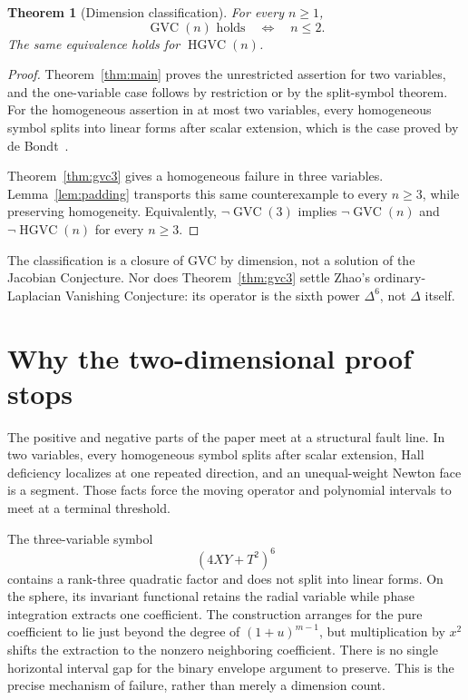 \documentclass[11pt]{article}
\newtheorem{theorem}{Theorem}[section]
\begin{document}
\begin{theorem}[Dimension classification]\label{thm:classification}
For every $n\geq1$,
\begin{equation}\label{eq:classification}
 \operatorname{GVC}(n)\text{ holds}
 \quad\Longleftrightarrow\quad
 n\leq2.
\end{equation}
The same equivalence holds for $\operatorname{HGVC}(n)$.
\end{theorem}

\begin{proof}
Theorem~\ref{thm:main} proves the unrestricted assertion for two variables,
and the one-variable case follows by restriction or by the split-symbol
theorem.  For the homogeneous assertion in at most two variables, every
homogeneous symbol splits into linear forms after scalar extension, which
is the case proved by de Bondt~\cite{deBondt}.

Theorem~\ref{thm:gvc3} gives a homogeneous failure in three variables.
Lemma~\ref{lem:padding} transports this same counterexample to every
$n\geq3$, while preserving homogeneity.  Equivalently,
$\neg\operatorname{GVC}(3)$ implies
$\neg\operatorname{GVC}(n)$ and
$\neg\operatorname{HGVC}(n)$ for every $n\geq3$.
\end{proof}

The classification is a closure of GVC by dimension, not a solution of the
Jacobian Conjecture.  Nor does Theorem~\ref{thm:gvc3} settle Zhao's
ordinary-Laplacian Vanishing Conjecture: its operator is the sixth power
$\Delta^6$, not $\Delta$ itself.

\section{Why the two-dimensional proof stops}

The positive and negative parts of the paper meet at a structural fault
line.  In two variables, every homogeneous symbol splits after scalar
extension, Hall deficiency localizes at one repeated direction, and an
unequal-weight Newton face is a segment.  Those facts force the moving
operator and polynomial intervals to meet at a terminal threshold.

The three-variable symbol
\[
 (4XY+T^2)^6
\]
contains a rank-three quadratic factor and does not split into linear forms.
On the sphere, its invariant functional retains the radial variable while
phase integration extracts one coefficient.  The construction arranges
for the pure coefficient to lie just beyond the degree of
$(1+u)^{m-1}$, but multiplication by $x^2$ shifts the extraction to the
nonzero neighboring coefficient.  There is no single horizontal interval
gap for the binary envelope argument to preserve.  This is the precise
mechanism of failure, rather than merely a dimension count.
\end{document}
